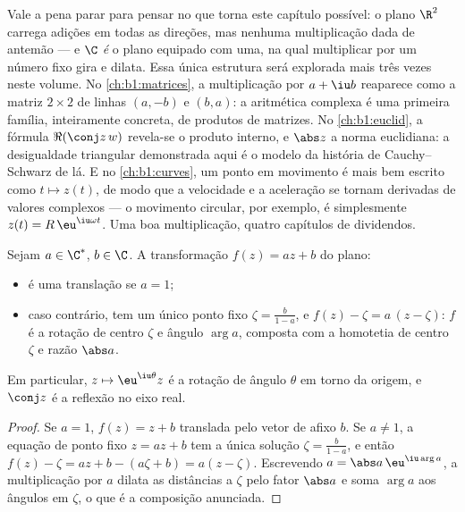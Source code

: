 \begin{remark}\label{rem:b1:complex:interlude}
Vale a pena parar para pensar no que torna este capítulo possível:
o plano $\R^2$ carrega adições em todas as direções, mas nenhuma
multiplicação dada de antemão --- e $\C$ \emph{é} o plano
equipado com uma, na qual multiplicar por um número fixo
gira e dilata. Essa única estrutura será explorada mais três
vezes neste volume. No \cref{ch:b1:matrices}, a multiplicação por
$a + \iu b$ reaparece como a matriz $2 \times 2$ de linhas $(a,
-b)$ e $(b, a)$: a aritmética complexa é uma primeira família,
inteiramente concreta, de produtos de matrizes. No \cref{ch:b1:euclid}, a
fórmula $\Re(\conj z\,w)$ revela-se o produto interno, e
$\abs z$ a norma euclidiana: a desigualdade triangular demonstrada aqui
é o modelo da história de Cauchy--Schwarz de lá. E no
\cref{ch:b1:curves}, um ponto em movimento é mais bem escrito como $t \mapsto
z(t)$, de modo que a velocidade e a aceleração se tornam
derivadas de valores complexos --- o movimento circular, por exemplo,
é simplesmente $z(t) =
R\,\eu^{\iu\omega t}$. Uma boa multiplicação, quatro
capítulos de dividendos.
\end{remark}

\begin{proposition}\label{prop:b1:complex:similitude}
Sejam $a \in \C^*$, $b \in \C$. A transformação $f(z) = az + b$ do
plano:
\begin{itemize}
  \item é uma translação se $a = 1$;
  \item caso contrário, tem um único ponto fixo $\zeta = \frac{b}{1-a}$,
        e $f(z) - \zeta = a\,(z - \zeta)$: $f$ é a rotação de
        centro $\zeta$ e ângulo $\arg a$, composta com a homotetia
        de centro $\zeta$ e razão $\abs a$.
\end{itemize}
Em particular, $z \mapsto \eu^{\iu\theta} z$ é a rotação de ângulo
$\theta$ em torno da origem, e $\conj z$ é a reflexão no eixo real.
\end{proposition}

\begin{proof}
Se $a = 1$, $f(z) = z + b$ translada pelo vetor de afixo $b$. Se
$a \neq 1$, a equação de ponto fixo $z = az + b$ tem a única
solução $\zeta = \frac{b}{1-a}$, e então $f(z) - \zeta = az + b -
(a\zeta + b) = a(z - \zeta)$. Escrevendo $a = \abs a\, \eu^{\iu\arg a}$,
a multiplicação por $a$ dilata as distâncias a $\zeta$ pelo fator
$\abs a$ e soma $\arg a$ aos ângulos em $\zeta$, o que é a composição
anunciada.
\end{proof}

